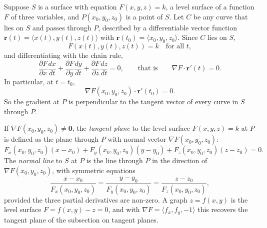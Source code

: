 \documentclass[11pt,a4paper]{article}
\theoremstyle{definition}
\begin{document}
Suppose $S$ is a surface with equation $F(x,y,z) = k$, a level surface of a
function $F$ of three variables, and $P(x_0,y_0,z_0)$ is a point of $S$. Let $C$
be any curve that lies on $S$ and passes through $P$, described by a
differentiable vector function $\mathbf r(t) = \langle x(t), y(t),
z(t)\rangle$ with $\mathbf r(t_0) = \langle x_0,y_0,z_0\rangle$. Since $C$ lies
on $S$,
\[F(x(t), y(t), z(t)) = k\quad\text{for all } t ,\]
and differentiating with the chain rule,
\[\frac{\partial F}{\partial x}\frac{dx}{dt} + \frac{\partial F}{\partial
y}\frac{dy}{dt} +\frac{\partial F}{\partial z}\frac{dz}{dt} = 0,\qquad\text{that
is}\qquad \nabla F \cdot \mathbf r'(t) =0 .\]
In particular, at $t = t_0$,
\[\nabla F(x_0, y_0,z_0)\cdot \mathbf r'(t_0) = 0 .\]
So the gradient at $P$ is perpendicular to the tangent vector of every curve in
$S$ through $P$.

\begin{figure}[H]
\centering
{}
\end{figure}

If $\nabla F(x_0, y_0, z_0) \neq \mathbf 0$, the \emph{tangent plane} to the
level surface $F(x,y,z) = k$ at $P$ is defined as the plane through $P$ with
normal vector $\nabla F(x_0, y_0, z_0)$:
\[F_x(x_0, y_0, z_0)(x -x_0) + F_y(x_0, y_0, z_0)(y -y_0) + F_z(x_0, y_0,
z_0)(z -z_0) = 0 .\]
The \emph{normal line} to $S$ at $P$ is the line through $P$ in the direction of
$\nabla F(x_0,y_0,z_0)$, with symmetric equations
\[ \frac{x - x_0}{F_x (x_0, y_0, z_0)}  = \frac{y - y_0}{F_y (x_0, y_0, z_0)} =
\frac{z - z_0}{F_z (x_0, y_0, z_0)} ,\]
provided the three partial derivatives are non-zero. A graph $z = f(x,y)$ is the
level surface $F = f(x,y) - z = 0$, and with $\nabla F = \langle f_x, f_y,
-1\rangle$ this recovers the tangent plane of the subsection on tangent planes.
\end{document}
